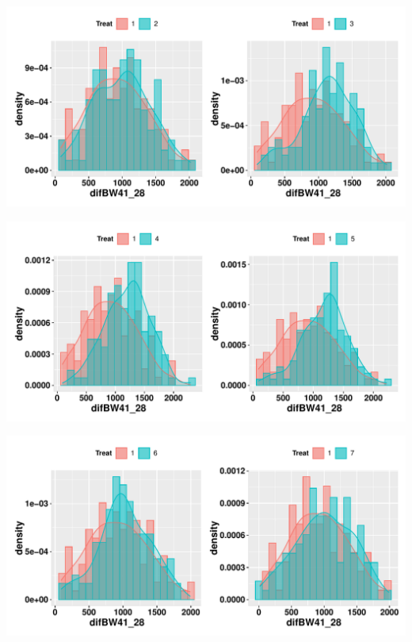 \documentclass[11pt,a4paper]{article}\usepackage[]{graphicx}\usepackage[]{color}
\makeatletter
\def\maxwidth{ %
  \ifdim\Gin@nat@width>\linewidth
    \linewidth
  \else
    \Gin@nat@width
  \fi
}
\newenvironment{knitrout}{}{} %
\makeatother
\begin{document}
\begin{knitrout}
\color{fgcolor}
\includegraphics[width=\maxwidth]{figure/unnamed-chunk-13-1} 

\includegraphics[width=\maxwidth]{figure/unnamed-chunk-13-2} 

\includegraphics[width=\maxwidth]{figure/unnamed-chunk-13-3} 

\end{knitrout}
\end{document}
